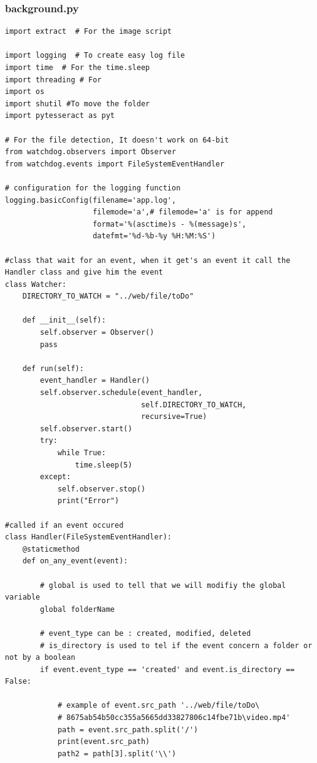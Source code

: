 \documentclass[12pt]{article}
\begin{document}
\subsubsection{background.py}	
\lstset{language=Python}
\begin{lstlisting}
import extract  # For the image script

import logging  # To create easy log file
import time  # For the time.sleep
import threading # For 
import os
import shutil #To move the folder
import pytesseract as pyt

# For the file detection, It doesn't work on 64-bit
from watchdog.observers import Observer
from watchdog.events import FileSystemEventHandler

# configuration for the logging function
logging.basicConfig(filename='app.log',
                    filemode='a',# filemode='a' is for append
                    format='%(asctime)s - %(message)s',
                    datefmt='%d-%b-%y %H:%M:%S')

#class that wait for an event, when it get's an event it call the Handler class and give him the event
class Watcher:
    DIRECTORY_TO_WATCH = "../web/file/toDo"
    
    def __init__(self):
        self.observer = Observer()
        pass

    def run(self):
        event_handler = Handler()
        self.observer.schedule(event_handler,
                               self.DIRECTORY_TO_WATCH,
                               recursive=True)
        self.observer.start()
        try:
            while True:
                time.sleep(5)
        except:
            self.observer.stop()
            print("Error")

#called if an event occured
class Handler(FileSystemEventHandler):
    @staticmethod
    def on_any_event(event):

        # global is used to tell that we will modifiy the global variable
        global folderName

        # event_type can be : created, modified, deleted
        # is_directory is used to tel if the event concern a folder or not by a boolean
        if event.event_type == 'created' and event.is_directory == False:

            # example of event.src_path '../web/file/toDo\ 
            # 8675ab54b50cc355a5665dd33827806c14fbe71b\video.mp4'
            path = event.src_path.split('/')
            print(event.src_path)
            path2 = path[3].split('\\')


\end{lstlisting}
\end{document}
